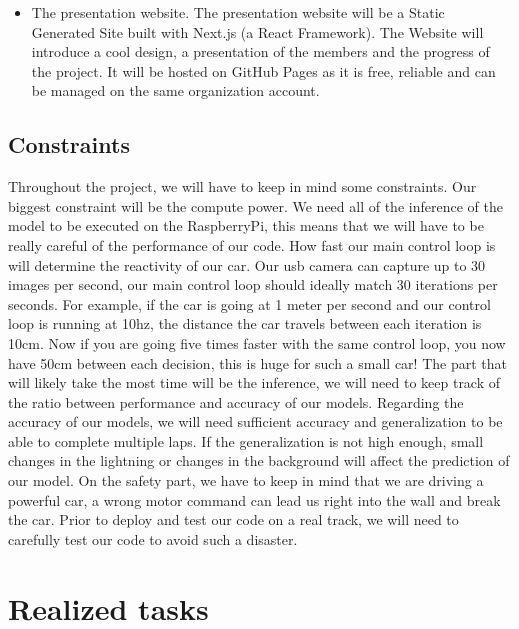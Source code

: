 \documentclass[12pt]{article}
\begin{document}
\begin{itemize}
\item The presentation website. The presentation website will be a Static Generated Site built with Next.js (a React Framework). The Website will introduce a cool design, a presentation of the members and the progress of the project. It will be hosted on GitHub Pages as it is free, reliable and can be managed on the same organization account.
\end{itemize}

\newpage
\subsection{Constraints}
Throughout the project, we will have to keep in mind some constraints.
Our biggest constraint will be the compute power. We need all of the inference of the model to be executed on the RaspberryPi, this means that we will have to be really careful of the performance of our code. How fast our main control loop is will determine the reactivity of our car. Our usb camera can capture up to 30 images per second, our main control loop should ideally match 30 iterations per seconds. For example, if the car is going at 1 meter per second and our control loop is running at 10hz, the distance the car travels between each iteration is 10cm. Now if you are going five times faster with the same control loop, you now have 50cm between each decision, this is huge for such a small car! The part that will likely take the most time will be the inference, we will need to keep track of the ratio between performance and accuracy of our models.
Regarding the accuracy of our models, we will need sufficient accuracy and generalization to be able to complete multiple laps. If the generalization is not high enough, small changes in the lightning or changes in the background will affect the prediction of our model.
On the safety part, we have to keep in mind that we are driving a powerful car, a wrong motor command can lead us right into the wall and break the car. Prior to deploy and test our code on a real track, we will need to carefully test our code to avoid such a disaster.

\newpage
\section{Realized tasks}
\end{document}
